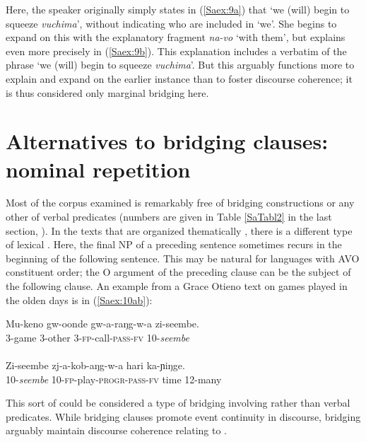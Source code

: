 \documentclass[output=paper]{LSP/langsci}
\begin{document}
Here, the speaker originally simply states in (\ref{Saex:9a}) that `we (will) begin to squeeze \textit{vuchima}', without indicating who are included in `we'. She begins to expand on this with the explanatory fragment \textit{na-vo} `with them', but explains even more precisely in (\ref{Saex:9b}). This explanation includes a verbatim  of the phrase `we (will) begin to squeeze \textit{vuchima}'. But this  arguably functions more to explain and expand on the earlier instance than to foster discourse coherence; it is thus considered only marginal bridging here.


\section{Alternatives to bridging clauses: nominal repetition}
\label{Saalternatives}
Most of the  corpus examined is remarkably free of bridging constructions or any other  of verbal predicates (numbers are given in Table \ref{SaTabl2} in the last section, ). In the  texts that are organized thematically \citep{farr99}, there is a different type of lexical . Here, the final NP of a preceding  sentence sometimes recurs in the beginning of the following sentence. This may be natural for languages with AVO constituent order; the O argument of the preceding clause can be the subject of the following clause. An example from a Grace Otieno text on games played in the olden days is in (\ref{Saex:10ab}):


\begin{exe}
\ex \label{Saex:10ab}
\begin{xlist}
\ex \label{Saex:10a}
\gll Mu-keno  gw-oonde  gw-a-raŋg-w-a    zi-seembe. \\
3-game    3-other    3-\textsc{fp}-call-\textsc{pass}-\textsc{fv}  10-\textit{seembe}\\
\glt {}\\
\ex \label{Saex:10b}
\gll Zi-seembe  zj-a-kob-aŋg-w-a    hari  ka-ɲiŋge.\\     	       
   10-\textit{seembe}  10-\textsc{fp}-play-\textsc{progr}-\textsc{pass}-\textsc{fv}  time  12-many\\
\glt {} 
\end{xlist}
\end{exe}


This sort of  could be considered a type of bridging involving  rather than verbal predicates. While bridging clauses promote event continuity in discourse, bridging  arguably maintain discourse coherence relating to . 
\end{document}
